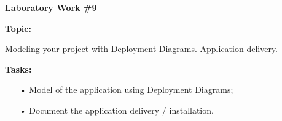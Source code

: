 \graphicspath{ {pic/} }
\begin{flushleft}
\setlength{\parindent}{2ex}\par
\textbf{Laboratory Work \#9} \par
\textbf{Topic:}\par
Modeling your project with Deployment Diagrams. Application delivery.
\par
\textbf{Tasks:}
\begin{enumerate}
\item[•] Model of the application using Deployment Diagrams;
\item[•] Document the application delivery / installation.
\end{enumerate}
\end{flushleft}
\clearpage